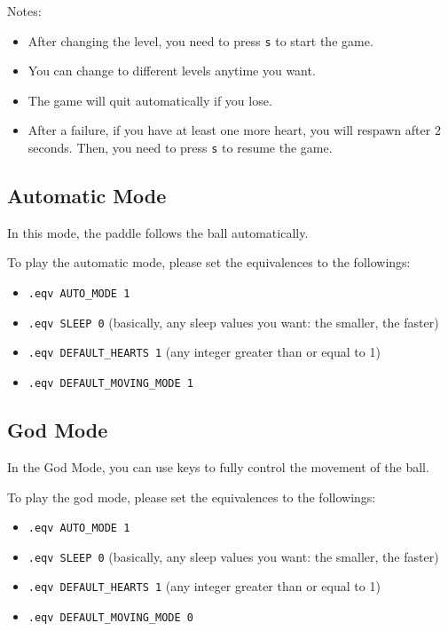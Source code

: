 \documentclass{article}
\newcommand{\code}[1]{\texttt{#1}}
\begin{document}
Notes: 
\begin{itemize}
    \item After changing the level, you need to press \code{s} to start the game.
    \item You can change to different levels anytime you want.
    \item The game will quit automatically if you lose.
    \item After a failure, if you have at least one more heart, you will respawn after 2 seconds. Then, you need to press \code{s} to resume the game.
\end{itemize}

\subsection{Automatic Mode}

In this mode, the paddle follows the ball automatically.

To play the automatic mode, please set the equivalences to the followings:

\begin{itemize}
    \item \code{.eqv AUTO\_MODE 1}
    \item \code{.eqv SLEEP 0} (basically, any sleep values you want: the smaller, the faster)
    \item \code{.eqv DEFAULT\_HEARTS 1} (any integer greater than or equal to 1)
    \item \code{.eqv\ DEFAULT\_MOVING\_MODE\ 1}
\end{itemize}

\subsection{God Mode}

In the God Mode, you can use keys to fully control the movement of the ball.

To play the god mode, please set the equivalences to the followings:

\begin{itemize}
    \item \code{.eqv AUTO\_MODE 1}
    \item \code{.eqv SLEEP 0} (basically, any sleep values you want: the smaller, the faster)
    \item \code{.eqv DEFAULT\_HEARTS 1} (any integer greater than or equal to 1)
    \item \code{.eqv\ DEFAULT\_MOVING\_MODE\ 0}
\end{itemize}
\end{document}
